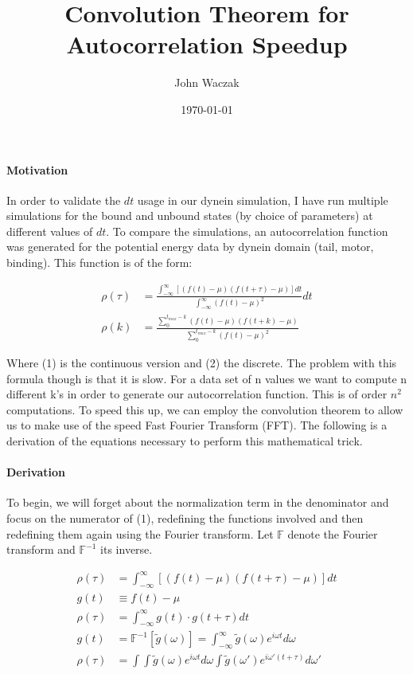 \documentclass[11pt]{article}
\newcommand{\F}{\mathbb{F}}
\begin{document}
	
\title{Convolution Theorem for Autocorrelation Speedup} 
\author{John Waczak} 
\date{\today}
\maketitle

\paragraph{Motivation} 	
	In order to validate the $dt$ usage in our dynein simulation, I have run multiple simulations for the bound and unbound states (by choice of parameters) at different values of $dt$. To compare the simulations, an autocorrelation function was generated for the potential energy data by dynein domain (tail, motor, binding). This function is of the form: 
	
	\begin{align}
		\rho(\tau) &= \frac{\int_{-\infty}^{\infty} [(f(t)-\mu)(f(t+\tau)-\mu)]dt}
		{\int_{-\infty}^{\infty}(f(t)-\mu)^2}dt \\ 
		\rho(k) &= \frac{\sum_{0}^{t_{max}-k} (f(t)-\mu)(f(t+k)-\mu)}
		{\sum_{0}^{t_{max}-k}(f(t)-\mu)^2}
	\end{align}
	
	Where (1) is the continuous version and (2) the discrete. The problem with this formula though is that it is slow. For a data set of n values we want to compute n different k's in order to generate our autocorrelation function. This is of order $n^2$ computations. To speed this up, we can employ the convolution theorem to allow us to make use of the speed Fast Fourier Transform (FFT). The following is a derivation of the equations necessary to perform this mathematical trick. 

\paragraph{Derivation}	
To begin, we will forget about the normalization term in the denominator and focus on the numerator of (1), redefining the functions involved and then redefining them again using the Fourier transform. Let $\F$ denote the Fourier transform and $\F^{-1}$ its inverse. 

\begin{align*}
	\rho(\tau) &= \int_{-\infty}^{\infty}[(f(t)-\mu)(f(t+\tau)-\mu)] dt \\
	g(t) &\equiv f(t)-\mu \\ 
	\rho(\tau) &= \int_{-\infty}^{\infty}g(t)\cdot g(t+\tau) dt \\ 
	g(t) &= \F^{-1}[\widetilde{g}(\omega)] = \int_{-\infty}^{\infty} \widetilde{g}(\omega) e^{i\omega t} d\omega \\ 
	\rho(\tau) &= \int \int \widetilde{g}(\omega) e^{i \omega t} d\omega \int \widetilde{g}(\omega') e^{i \omega' (t+\tau)} d\omega'
\end{align*}
\end{document}
